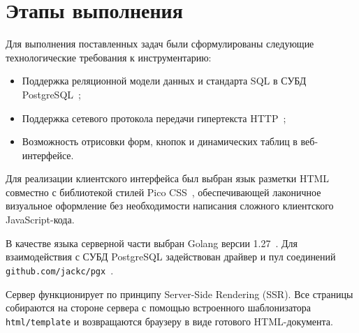 \chapter{Этапы выполнения}
\label{cha:stages}

Для выполнения поставленных задач были сформулированы следующие технологические требования к инструментарию:
\begin{itemize}
    \item Поддержка реляционной модели данных и стандарта SQL в СУБД PostgreSQL~\cite{doc:postgres,doc:sql};
    \item Поддержка сетевого протокола передачи гипертекста HTTP~\cite{wiki:http};
    \item Возможность отрисовки форм, кнопок и динамических таблиц в веб-интерфейсе.
\end{itemize}

Для реализации клиентского интерфейса был выбран язык разметки HTML~\cite{wiki:html} совместно с библиотекой стилей Pico CSS~\cite{wiki:pico.css}, обеспечивающей лаконичное визуальное оформление без необходимости написания сложного клиентского JavaScript-кода.

В качестве языка серверной части выбран Golang версии 1.27~\cite{wiki:go}. Для взаимодействия с СУБД PostgreSQL задействован драйвер и пул соединений \texttt{github.com/jackc/pgx}~\cite{git:pgx}.

Сервер функционирует по принципу Server-Side Rendering (SSR). Все страницы собираются на стороне сервера с помощью встроенного шаблонизатора \texttt{html/template} и возвращаются браузеру в виде готового HTML-документа.
